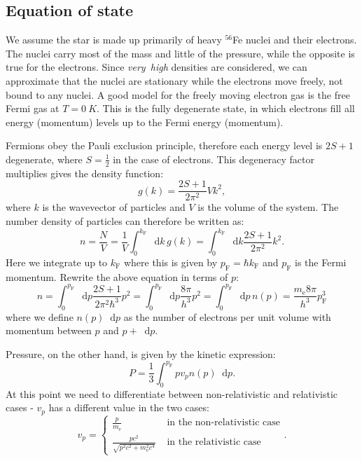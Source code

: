 \documentclass[]{article}
\newcommand{\dd}{\mathop{}\!\mathrm{d}}
\newcommand{\fermiMtm}{p_\mathrm{F}}
\newcommand{\massElectron}{m_\mathrm{e}}
\begin{document}
\subsection{Equation of state}
	We assume the star is made up primarily of heavy $^{56}$Fe nuclei and their electrons. The nuclei carry most of the mass and little of the pressure, while the opposite is true for the electrons. Since \emph{very~high} densities are considered, we can approximate that the nuclei are stationary while the electrons move freely, not bound to any nuclei. A good model for the freely moving electron gas is the free Fermi gas at $T = \SI{0}{K}$. This is the fully degenerate state, in which electrons fill all energy (momentum) levels up to the Fermi energy (momentum).

	Fermions obey the Pauli exclusion principle, therefore each energy level is $2S + 1$ degenerate, where $S = \frac{1}{2}$ in the case of electrons. This degeneracy factor multiplies gives the density function:
	\begin{equation}
		g(k) = \frac{2S + 1}{2 \pi^2} V k^2,
	\end{equation}
	where $k$ is the wavevector of particles and $V$ is the volume of the system. The number density of particles can therefore be written as:
	\begin{equation}
		n = \frac{N}{V} = \frac{1}{V} \int_0^{k_\mathrm{F}} \dd k \, g(k) = \int_0^{k_\mathrm{F}} \dd k \frac{2S + 1}{2 \pi^2} k^2.
	\end{equation}
	Here we integrate up to $k_\mathrm{F}$ where this is given by $\fermiMtm = \hbar k_\mathrm{F}$ and $\fermiMtm$ is the Fermi momentum. Rewrite the above equation in terms of $p$:
	\begin{equation}\label{eqn:number-density}
		n = \int_0^{\fermiMtm} \dd p \frac{2S + 1}{2 \pi^2 \hbar^3} p^2 = \int_0^{\fermiMtm} \dd p \frac{8 \pi}{h^3} p^2 = \int_0^{\fermiMtm} \dd p \, n(p) = \frac{\massElectron8 \pi}{h^3} \fermiMtm^3
	\end{equation}
	where we define $n(p) \dd p$ as the number of electrons per unit volume with momentum between $p$ and $p + \dd p$.

	Pressure, on the other hand, is given by the kinetic expression:
	\begin{equation}\label{eqn:pressure-int}
		P = \frac{1}{3} \int_0^{\fermiMtm} p v_p n(p) \dd p.
	\end{equation}
	At this point we need to differentiate between non-relativistic and relativistic cases - $v_p$ has a different value in the two cases:
	\begin{equation}
		v_p = \begin{cases}
			\frac{p}{\massElectron} & \text{ in the non-relativistic case} \\
			\frac{pc^2}{\sqrt{p^2c^2 + \massElectron^2 c^4}} & \text{ in the relativistic case}
		\end{cases}.
	\end{equation}
\end{document}
